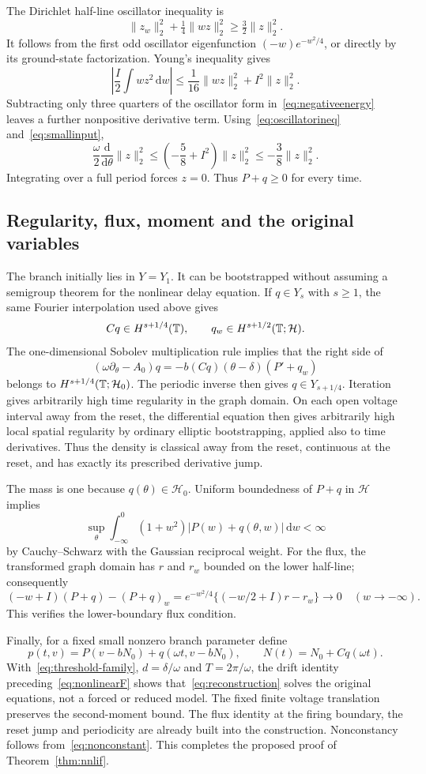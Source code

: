\documentclass[11pt,a4paper]{article}
\numberwithin{equation}{section}
\theoremstyle{remark}\newtheorem{remark}[theorem]{Remark}
\newcommand{\HH}{\mathcal H}\newcommand{\DD}{\mathcal D}
\newcommand{\dd}{\,\mathrm d}
\begin{document}
The Dirichlet half-line oscillator inequality is
\begin{equation}\label{eq:oscillatorineq}
 \|z_w\|_2^2+\tfrac14\|wz\|_2^2\geq\tfrac32\|z\|_2^2.
\end{equation}
It follows from the first odd oscillator eigenfunction $(-w)e^{-w^2/4}$, or directly by its ground-state factorization. Young's inequality gives
\[
 \left|\frac I2\int wz^2\dd w\right|
 \leq\frac1{16}\|wz\|_2^2+I^2\|z\|_2^2.
\]
Subtracting only three quarters of the oscillator form in~\eqref{eq:negativeenergy} leaves a further nonpositive derivative term. Using~\eqref{eq:oscillatorineq} and~\eqref{eq:smallinput},
\[
 \frac\omega2\frac{\mathrm d}{\mathrm d\theta}\|z\|_2^2
 \leq\left(-\frac58+I^2\right)\|z\|_2^2
 \leq-\frac38\|z\|_2^2.
\]
Integrating over a full period forces $z=0$. Thus $P+q\geq0$ for every time.

\subsection{Regularity, flux, moment and the original variables}
The branch initially lies in $Y=Y_1$. It can be bootstrapped without assuming a semigroup theorem for the nonlinear delay equation. If $q\in Y_s$ with $s\geq1$, the same Fourier interpolation used above gives
\[
 Cq\in H^{s+1/4}(\T),\qquad
 q_w\in H^{s+1/2}(\T;\HH).
\]
The one-dimensional Sobolev multiplication rule implies that the right side of
\[
 (\omega\partial_\theta-A_0)q
 =-b(Cq)(\theta-\delta)(P'+q_w)
\]
belongs to $H^{s+1/4}(\T;\HH_0)$. The periodic inverse then gives $q\in Y_{s+1/4}$. Iteration gives arbitrarily high time regularity in the graph domain. On each open voltage interval away from the reset, the differential equation then gives arbitrarily high local spatial regularity by ordinary elliptic bootstrapping, applied also to time derivatives. Thus the density is classical away from the reset, continuous at the reset, and has exactly its prescribed derivative jump.

The mass is one because $q(\theta)\in\HH_0$. Uniform boundedness of $P+q$ in $\HH$ implies
\[
 \sup_\theta\int_{-\infty}^0(1+w^2)|P(w)+q(\theta,w)|\dd w<\infty
\]
by Cauchy--Schwarz with the Gaussian reciprocal weight. For the flux, the transformed graph domain has $r$ and $r_w$ bounded on the lower half-line; consequently
\[
 (-w+I)(P+q)-(P+q)_w
 =e^{-w^2/4}\{(-w/2+I)r-r_w\}\longrightarrow0
 \quad(w\to-\infty).
\]
This verifies the lower-boundary flux condition.

Finally, for a fixed small nonzero branch parameter define
\begin{equation}\label{eq:reconstruction}
 p(t,v)=P(v-bN_0)+q(\omega t,v-bN_0),
 \qquad N(t)=N_0+Cq(\omega t).
\end{equation}
With~\eqref{eq:threshold-family}, $d=\delta/\omega$ and $T=2\pi/\omega$, the drift identity preceding~\eqref{eq:nonlinearF} shows that~\eqref{eq:reconstruction} solves the original equations, not a forced or reduced model. The fixed finite voltage translation preserves the second-moment bound. The flux identity at the firing boundary, the reset jump and periodicity are already built into the construction. Nonconstancy follows from~\eqref{eq:nonconstant}. This completes the proposed proof of Theorem~\ref{thm:nnlif}.
\end{document}
